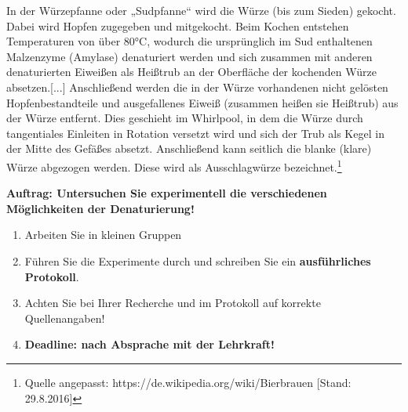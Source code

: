 \documentclass{scrartcl}  %
\begin{document}
\begin{tcolorbox}
				In der Würzepfanne oder „Sudpfanne“ wird die Würze (bis zum Sieden) gekocht. Dabei wird Hopfen zugegeben und mitgekocht. Beim Kochen entstehen Temperaturen von über 80°C, wodurch die ursprünglich im Sud enthaltenen Malzenzyme (Amylase) denaturiert werden und sich zusammen mit anderen denaturierten Eiweißen als Heißtrub an der Oberfläche der kochenden Würze absetzen.[...] \newline
				Anschließend werden die in der Würze vorhandenen nicht gelösten Hopfenbestandteile und ausgefallenes Eiweiß (zusammen heißen sie Heißtrub) aus der Würze entfernt. Dies geschieht im Whirlpool, in dem die Würze durch tangentiales Einleiten in Rotation versetzt wird und sich der Trub als Kegel in der Mitte des Gefäßes absetzt. Anschließend kann seitlich die blanke (klare) Würze abgezogen werden. Diese wird als Ausschlagwürze bezeichnet.\footnote{Quelle angepasst: https://de.wikipedia.org/wiki/Bierbrauen [Stand: 29.8.2016]}
			\end{tcolorbox}	

\vspace{0.3cm}
			\noindent \textbf{Auftrag: Untersuchen Sie experimentell die verschiedenen Möglichkeiten der Denaturierung!}
			\begin{enumerate}
				\item Arbeiten Sie in kleinen Gruppen
			    \item Führen Sie die Experimente durch und schreiben Sie ein \textbf{ausführliches Protokoll}.
			    \item Achten Sie bei Ihrer Recherche und im Protokoll auf korrekte Quellenangaben!
			    \item \textbf{Deadline: nach Absprache mit der Lehrkraft!}
			\end{enumerate}
			
\end{document}
